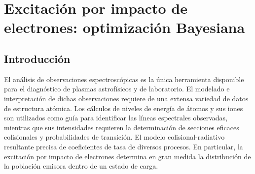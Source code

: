 \chapter{Excitación por impacto de electrones: optimización Bayesiana}
\label{chap:bayeopt}

\begin{comment}

\end{comment}

\section{Introducción}
\label{sec:intro}

El análisis de observaciones espectroscópicas es la única herramienta 
disponible para el diagnóstico de plasmas astrofísicos y de laboratorio. 
El modelado e interpretación de dichas observaciones requiere de una 
extensa variedad de datos de estructura atómica. Los cálculos de niveles 
de energía de átomos y sus iones son utilizados como guía para 
identificar las líneas espectrales observadas, mientras que sus 
intensidades requieren la determinación de secciones eficaces 
colisionales y probabilidades de transición. El modelo 
colisional-radiativo resultante precisa de coeficientes de tasa de 
diversos procesos. En particular, la excitación por impacto de 
electrones determina en gran medida la distribución de la población 
emisora dentro de un estado de carga. 

